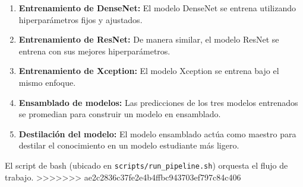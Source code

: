 \begin{enumerate}
    \item \textbf{Entrenamiento de DenseNet:} El modelo DenseNet se entrena utilizando hiperparámetros fijos y ajustados.
    \item \textbf{Entrenamiento de ResNet:} De manera similar, el modelo ResNet se entrena con sus mejores hiperparámetros.
    \item \textbf{Entrenamiento de Xception:} El modelo Xception se entrena bajo el mismo enfoque.
    \item \textbf{Ensamblado de modelos:} Las predicciones de los tres modelos entrenados se promedian para construir un modelo en ensamblado.
    \item \textbf{Destilación del modelo:} El modelo ensamblado actúa como maestro para destilar el conocimiento en un modelo estudiante más ligero.
\end{enumerate}

El script de bash (ubicado en \texttt{scripts/run\_pipeline.sh}) orquesta el flujo de trabajo.
>>>>>>> ae2c2836c37fe2e4b4ffbc943703ef797c84c406
